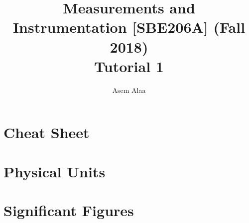 \documentclass[a4paper,11pt]{book}
\begin{document}
\author{Asem Alaa}

\title{Measurements and Instrumentation [SBE206A] (Fall 2018)\\ Tutorial 1}

\maketitle

\chapter*{Cheat Sheet}


\chapter*{Physical Units}



\chapter*{Significant Figures}

\end{document}
